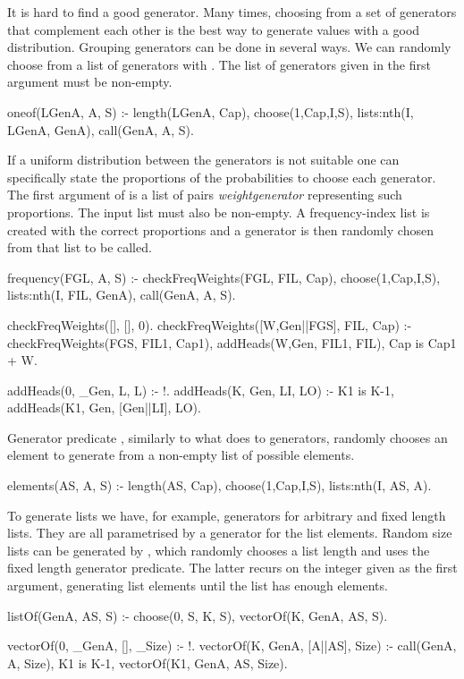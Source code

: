 It is hard to find a good generator.
%
Many times, choosing from a set of generators that complement each other
is the best way to generate values with a good distribution.
%
Grouping generators can be done in several ways.
%
We can randomly choose from a list of generators with .
%
The list of generators given in the first argument must be non-empty.
%
\begin{yapcode}
 oneof(LGenA, A, S) :-
   length(LGenA, Cap),
   choose(1,Cap,I,S),
   lists:nth(I, LGenA, GenA),
   call(GenA, A, S).
\end{yapcode}
%
If a uniform distribution between the generators is not suitable one can
specifically state the proportions of the probabilities to choose each
generator.
%
The first argument of  is a list of pairs
\yap{\{}\emph{weight}\yap{,}\emph{generator}\yap{\}} representing such
proportions.
%
The input list must also be non-empty.
%
A frequency-index list is created with the correct proportions and a
generator is then randomly chosen from that list to be called.
\begin{yapcode}
 frequency(FGL, A, S) :-
   checkFreqWeights(FGL, FIL, Cap),
   choose(1,Cap,I,S),
   lists:nth(I, FIL, GenA),
   call(GenA, A, S).

 checkFreqWeights([], [], 0).
 checkFreqWeights([{W,Gen}||FGS], FIL, Cap) :-
   checkFreqWeights(FGS, FIL1, Cap1),
   addHeads(W,Gen, FIL1, FIL),
   Cap is Cap1 + W.

 addHeads(0, _Gen, L, L) :- !.
 addHeads(K, Gen, LI, LO) :-
   K1 is K-1,
   addHeads(K1, Gen, [Gen||LI], LO).
\end{yapcode}


Generator predicate , similarly to what
 does to generators, randomly chooses an element to
generate from a non-empty list of possible elements.
%
\begin{yapcode}
 elements(AS, A, S) :-
   length(AS, Cap),
   choose(1,Cap,I,S),
   lists:nth(I, AS, A).
\end{yapcode}



To generate lists we have, for example, generators for arbitrary and
fixed length lists.
%
They are all parametrised by a generator for the list elements.
%
Random size lists can be generated by , which randomly
chooses a list length and uses the  fixed length
generator predicate.
%
The latter recurs on the integer given as the first argument, generating
list elements until the list has enough elements.
\begin{yapcode}
 listOf(GenA, AS, S) :-
   choose(0, S, K, S),
   vectorOf(K, GenA, AS, S).

 vectorOf(0, _GenA, [], _Size) :- !.
 vectorOf(K, GenA, [A||AS], Size) :-
   call(GenA, A, Size),
   K1 is K-1,
   vectorOf(K1, GenA, AS, Size).
\end{yapcode}


